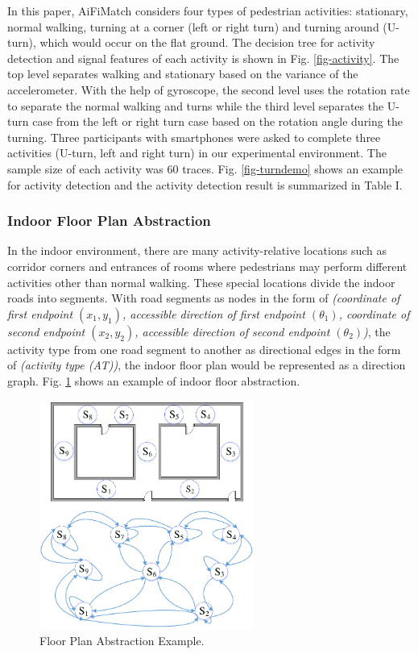 \documentclass[conference]{IEEEtran}
\begin{document}
In this paper, AiFiMatch considers four types of pedestrian activities: stationary, normal walking, turning at a corner (left or right turn) and turning around (U-turn), which would occur on the flat ground. The decision tree for activity detection and signal features of each activity is shown in Fig. \ref{fig-activity}. The top level separates walking and stationary based on the variance of the accelerometer. With the help of gyroscope, the second level uses the rotation rate to separate the normal walking and turns while the third level separates the U-turn case from the left or right turn case based on the rotation angle during the turning. Three participants with smartphones were asked to complete three activities (U-turn, left and right turn) in our experimental environment. The sample size of each activity was $60$ traces. Fig. \ref{fig-turndemo} shows an example for activity detection and the activity detection result is summarized in Table I.

\subsubsection{Indoor Floor Plan Abstraction}

In the indoor environment, there are many activity-relative locations such as corridor corners and entrances of rooms where pedestrians may perform different activities other than normal walking. These special locations divide the indoor roads into segments. With road segments as nodes in the form of \emph{(coordinate of first endpoint $(x_1,y_1)$, accessible direction of first endpoint $({\theta}_1)$, coordinate of second endpoint $(x_2,y_2)$, accessible direction of second endpoint $({\theta}_2)$)}, the activity type from one road segment to another as directional edges in the form of \emph{(activity type (AT))}, the indoor floor plan would be represented as a direction graph. Fig. \ref{fig-abstract} shows an example of indoor floor abstraction. 

\begin{figure}[!htbp]
	\centering
	\includegraphics[width=2.776in]{AiFiMatch-MapAbstract}
	\caption{Floor Plan Abstraction Example.}
	\label{fig-abstract}
\end{figure}
\end{document}
